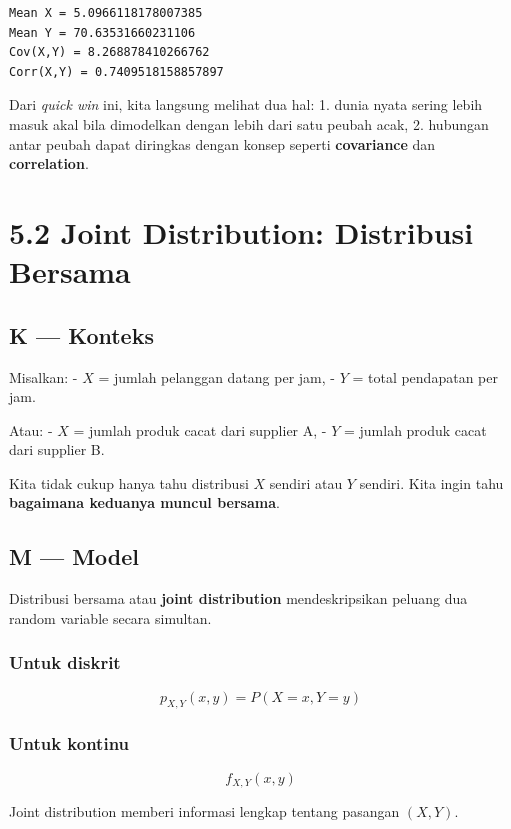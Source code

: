 \documentclass[
  letterpaper,
  DIV=11,
  numbers=noendperiod]{scrreprt}
\begin{document}
\begin{verbatim}
Mean X = 5.0966118178007385
Mean Y = 70.63531660231106
Cov(X,Y) = 8.268878410266762
Corr(X,Y) = 0.7409518158857897
\end{verbatim}

Dari \emph{quick win} ini, kita langsung melihat dua hal: 1. dunia nyata
sering lebih masuk akal bila dimodelkan dengan lebih dari satu peubah
acak, 2. hubungan antar peubah dapat diringkas dengan konsep seperti
\textbf{covariance} dan \textbf{correlation}.

\section{5.2 Joint Distribution: Distribusi
Bersama}\label{joint-distribution-distribusi-bersama}

\subsection{K --- Konteks}\label{k-konteks-31}

Misalkan: - \(X\) = jumlah pelanggan datang per jam, - \(Y\) = total
pendapatan per jam.

Atau: - \(X\) = jumlah produk cacat dari supplier A, - \(Y\) = jumlah
produk cacat dari supplier B.

Kita tidak cukup hanya tahu distribusi \(X\) sendiri atau \(Y\) sendiri.
Kita ingin tahu \textbf{bagaimana keduanya muncul bersama}.

\subsection{M --- Model}\label{m-model-31}

Distribusi bersama atau \textbf{joint distribution} mendeskripsikan
peluang dua random variable secara simultan.

\subsubsection{Untuk diskrit}\label{untuk-diskrit-1}

\[
p_{X,Y}(x,y)=P(X=x, Y=y)
\]

\subsubsection{Untuk kontinu}\label{untuk-kontinu-1}

\[
f_{X,Y}(x,y)
\]

Joint distribution memberi informasi lengkap tentang pasangan \((X,Y)\).
\end{document}

